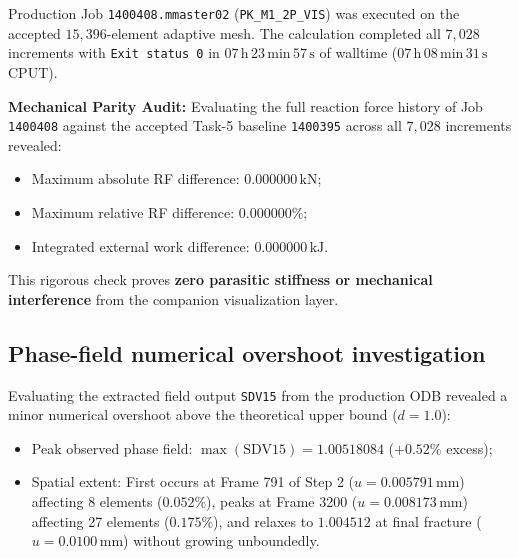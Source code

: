 Production Job \texttt{1400408.mmaster02} (\texttt{PK\_M1\_2P\_VIS}) was executed on the accepted $15{,}396$-element adaptive mesh. The calculation completed all $7{,}028$ increments with \texttt{Exit status 0} in $07\,\mathrm{h}\,23\,\mathrm{min}\,57\,\mathrm{s}$ of walltime ($07\,\mathrm{h}\,08\,\mathrm{min}\,31\,\mathrm{s}$ CPUT).

\textbf{Mechanical Parity Audit:} Evaluating the full reaction force history of Job \texttt{1400408} against the accepted Task-5 baseline \texttt{1400395} across all $7{,}028$ increments revealed:
\begin{itemize}
  \item Maximum absolute RF difference: $\mathbf{0.000000\,\mathrm{kN}}$;
  \item Maximum relative RF difference: $\mathbf{0.000000\%}$;
  \item Integrated external work difference: $\mathbf{0.000000\,\mathrm{kJ}}$.
\end{itemize}
This rigorous check proves \textbf{zero parasitic stiffness or mechanical interference} from the companion visualization layer.

\subsection{Phase-field numerical overshoot investigation}
Evaluating the extracted field output \texttt{SDV15} from the production ODB revealed a minor numerical overshoot above the theoretical upper bound ($d = 1.0$):
\begin{itemize}
  \item Peak observed phase field: $\max(\text{SDV15}) = \mathbf{1.00518084}$ ($+0.52\%$ excess);
  \item Spatial extent: First occurs at Frame 791 of Step 2 ($u = 0.005791\,\mathrm{mm}$) affecting 8 elements ($0.052\%$), peaks at Frame 3200 ($u = 0.008173\,\mathrm{mm}$) affecting 27 elements ($0.175\%$), and relaxes to $1.004512$ at final fracture ($u = 0.0100\,\mathrm{mm}$) without growing unboundedly.
\end{itemize}

